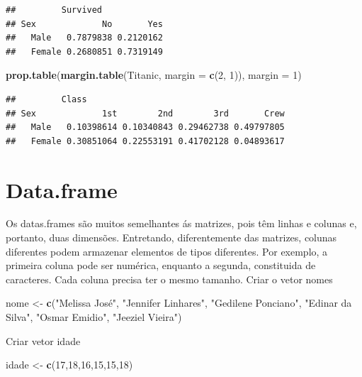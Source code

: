 \documentclass[
]{book}
\newenvironment{Shaded}{\begin{snugshade}}{\end{snugshade}}
\newcommand{\DataTypeTok}[1]{\textcolor[rgb]{0.13,0.29,0.53}{#1}}
\newcommand{\DecValTok}[1]{\textcolor[rgb]{0.00,0.00,0.81}{#1}}
\newcommand{\KeywordTok}[1]{\textcolor[rgb]{0.13,0.29,0.53}{\textbf{#1}}}
\newcommand{\NormalTok}[1]{#1}
\newcommand{\StringTok}[1]{\textcolor[rgb]{0.31,0.60,0.02}{#1}}
\begin{document}
\begin{verbatim}
##         Survived
## Sex             No       Yes
##   Male   0.7879838 0.2120162
##   Female 0.2680851 0.7319149
\end{verbatim}

\begin{Shaded}
\begin{Highlighting}[]
\KeywordTok{prop.table}\NormalTok{(}\KeywordTok{margin.table}\NormalTok{(Titanic, }\DataTypeTok{margin =} \KeywordTok{c}\NormalTok{(}\DecValTok{2}\NormalTok{, }\DecValTok{1}\NormalTok{)), }\DataTypeTok{margin =} \DecValTok{1}\NormalTok{)}
\end{Highlighting}
\end{Shaded}

\begin{verbatim}
##         Class
## Sex             1st        2nd        3rd       Crew
##   Male   0.10398614 0.10340843 0.29462738 0.49797805
##   Female 0.30851064 0.22553191 0.41702128 0.04893617
\end{verbatim}

\hypertarget{data.frame}{%
\section{Data.frame}\label{data.frame}}

Os datas.frames são muitos semelhantes ás matrizes, pois têm linhas e colunas e, portanto, duas dimensões. Entretando, diferentemente das matrizes, colunas diferentes podem armazenar elementos de tipos diferentes. Por exemplo, a primeira coluna pode ser numérica, enquanto a segunda, constituida de caracteres. Cada coluna precisa ter o mesmo tamanho.
Criar o vetor nomes

\begin{Shaded}
\begin{Highlighting}[]
\NormalTok{nome <-}\StringTok{ }\KeywordTok{c}\NormalTok{(}\StringTok{"Melissa José"}\NormalTok{,}
          \StringTok{"Jennifer Linhares"}\NormalTok{,}
          \StringTok{"Gedilene Ponciano"}\NormalTok{,}
          \StringTok{"Edinar da Silva"}\NormalTok{,}
          \StringTok{"Osmar Emidio"}\NormalTok{,}
          \StringTok{"Jeeziel Vieira"}\NormalTok{)}
\end{Highlighting}
\end{Shaded}

Criar vetor idade

\begin{Shaded}
\begin{Highlighting}[]
\NormalTok{idade <-}\StringTok{ }\KeywordTok{c}\NormalTok{(}\DecValTok{17}\NormalTok{,}\DecValTok{18}\NormalTok{,}\DecValTok{16}\NormalTok{,}\DecValTok{15}\NormalTok{,}\DecValTok{15}\NormalTok{,}\DecValTok{18}\NormalTok{)}
\end{Highlighting}
\end{Shaded}
\end{document}
